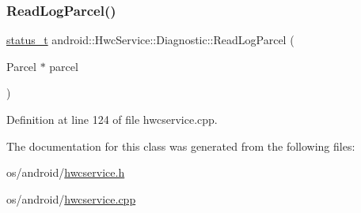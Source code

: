 \subsubsection{\texorpdfstring{Read\+Log\+Parcel()}{ReadLogParcel()}}
{\footnotesize\ttfamily \mbox{\hyperlink{hwcserviceapi_8h_a3806fb2027d9a316d8ca8d9b8b8eb96f}{status\+\_\+t}} android\+::\+Hwc\+Service\+::\+Diagnostic\+::\+Read\+Log\+Parcel (\begin{DoxyParamCaption}\item[{Parcel $\ast$}]{parcel }\end{DoxyParamCaption})\hspace{0.3cm}{\ttfamily [override]}}



Definition at line 124 of file hwcservice.\+cpp.


\begin{DoxyCode}{0}
\end{DoxyCode}


The documentation for this class was generated from the following files\+:\begin{DoxyCompactItemize}
\item 
os/android/\mbox{\hyperlink{hwcservice_8h}{hwcservice.\+h}}\item 
os/android/\mbox{\hyperlink{hwcservice_8cpp}{hwcservice.\+cpp}}\end{DoxyCompactItemize}
